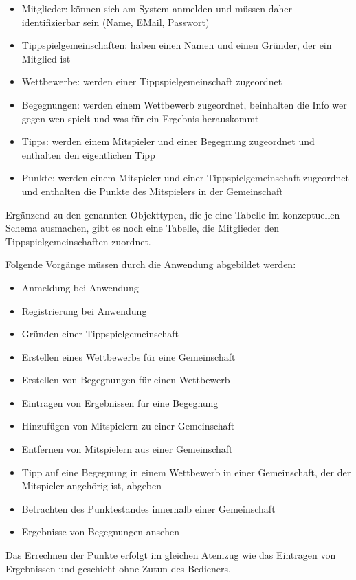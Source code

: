 \documentclass[ngerman]{gdb-aufgabenblatt}
\begin{document}
		\begin{itemize}
			\item	Mitglieder: können sich am System anmelden und müssen daher identifizierbar sein (Name, EMail, Passwort)
			\item	Tippspielgemeinschaften: haben einen Namen und einen Gründer, der ein Mitglied ist
			\item	Wettbewerbe: werden einer Tippspielgemeinschaft zugeordnet
			\item	Begegnungen: werden einem Wettbewerb zugeordnet, beinhalten die Info wer gegen wen spielt und was für ein Ergebnis herauskommt
			\item	Tipps: werden einem Mitspieler und einer Begegnung zugeordnet und enthalten den eigentlichen Tipp
			\item	Punkte: werden einem Mitspieler und einer Tippspielgemeinschaft zugeordnet und enthalten die Punkte des Mitspielers in der Gemeinschaft
		\end{itemize}
		Ergänzend zu den genannten Objekttypen, die je eine Tabelle im konzeptuellen Schema ausmachen, gibt es noch eine Tabelle, die Mitglieder den Tippspielgemeinschaften zuordnet.
		
		Folgende Vorgänge müssen durch die Anwendung abgebildet werden:
		\begin{itemize}
			\item	Anmeldung bei Anwendung
			\item	Registrierung bei Anwendung
			\item	Gründen einer Tippspielgemeinschaft
			\item	Erstellen eines Wettbewerbs für eine Gemeinschaft
			\item	Erstellen von Begegnungen für einen Wettbewerb
			\item	Eintragen von Ergebnissen für eine Begegnung
			\item	Hinzufügen von Mitspielern zu einer Gemeinschaft
			\item	Entfernen von Mitspielern aus einer Gemeinschaft
			\item	Tipp auf eine Begegnung in einem Wettbewerb in einer Gemeinschaft, der der Mitspieler angehörig ist, abgeben
			\item	Betrachten des Punktestandes innerhalb einer Gemeinschaft
			\item	Ergebnisse von Begegnungen ansehen
		\end{itemize}
		Das Errechnen der Punkte erfolgt im gleichen Atemzug wie das Eintragen von Ergebnissen und geschieht ohne Zutun des Bedieners.
\end{document}
